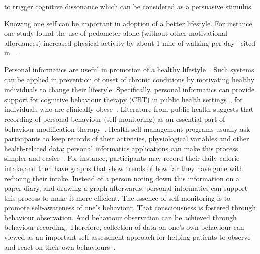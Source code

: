to trigger cognitive dissonance which can be considered as a persuasive stimulus. 

Knowing one self can be important in adoption of a better lifestyle. For instance one study found the use of pedometer alone (without other motivational affordances) increased physical activity by about 1 mile of walking per day~\citep{bravata2007using} cited in ~\cite{albaina2009flowie}. 

Personal informatics are useful in promotion of a healthy lifestyle~\citep{korhonen2010personal}. Such systems can be applied in prevention of onset of chronic conditions by motivating healthy individuals to change their lifestyle. Specifically, personal informatics can provide support for cognitive behaviour therapy (CBT) in public health settings~\citep{mattila2008mobile}, for individuals who are clinically obese~\citep{nih2000practical}. Literature from public health suggests that recording of personal behaviour (self-monitoring) as an essential part of behaviour modification therapy~\citep{nih2000practical}. Health self-management programs usually ask participants to keep records of their activities, physiological variables and other health-related data; personal informatics applications can make this process simpler and easier~\citep{medynskiy2010salud}. For instance, participants may record their daily calorie intake,and then have graphs that show trends of how far they have gone with reducing their intake. Instead of a person noting down this information on a paper diary, and drawing a graph afterwards, personal informatics can support this process to make it more efficient. The essence of self-monitoring is to promote self-awareness of one’s behaviour. That consciousness is fostered through behaviour observation. And behaviour observation can be achieved through behaviour recording. Therefore, collection of data on one's own behaviour can viewed as an important self-assessment approach for helping patients to observe and react on their own behaviours~\citep{rapp2014meaningful}.  

